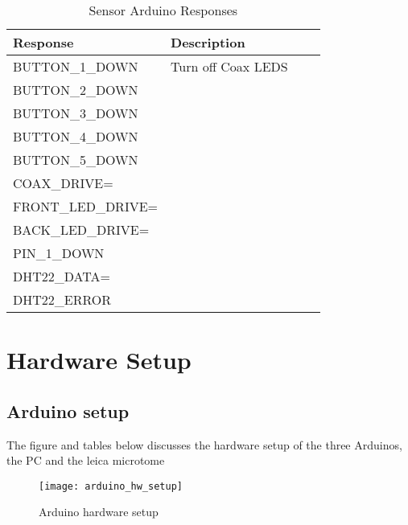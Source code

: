 \documentclass[11pt,fleqn]{book} %
\begin{document}
\begin{table}[h]
\centering
\begin{tabular}{l l p{160pt} p{160pt}}
\toprule
\textbf{Response} & \textbf{Description}\\
\midrule
BUTTON\_1\_DOWN & Turn off Coax LEDS \\
BUTTON\_2\_DOWN &  \\
BUTTON\_3\_DOWN &  \\
BUTTON\_4\_DOWN &  \\
BUTTON\_5\_DOWN &  \\
COAX\_DRIVE=		&	\\
FRONT\_LED\_DRIVE=		&	\\
BACK\_LED\_DRIVE=		&	\\
PIN\_1\_DOWN			&	\\
DHT22\_DATA=			& \\
DHT22\_ERROR & \\


\bottomrule
\end{tabular}
\caption{Sensor Arduino Responses}\label{tab:sac}
\end{table}

\clearpage

\section{Hardware Setup}
\subsection{Arduino setup}
The figure and tables below discusses the hardware setup of the three Arduinos, the PC and the leica microtome

\begin{figure}[h]
\centering\texttt{[image: arduino\_hw\_setup]}
\caption{Arduino hardware setup}
\end{figure}
\end{document}
